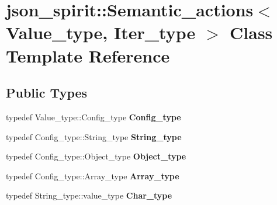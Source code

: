\hypertarget{classjson__spirit_1_1_semantic__actions}{}\section{json\+\_\+spirit\+::Semantic\+\_\+actions$<$ Value\+\_\+type, Iter\+\_\+type $>$ Class Template Reference}
\label{classjson__spirit_1_1_semantic__actions}
\subsection*{Public Types}
\begin{DoxyCompactItemize}
\item 
\mbox{\label{classjson__spirit_1_1_semantic__actions_ac131d112e94a0861e12253a0dc5a7036}} 
typedef Value\+\_\+type\+::\+Config\+\_\+type {\bfseries Config\+\_\+type}
\item 
\mbox{\label{classjson__spirit_1_1_semantic__actions_a3e726d04ba8bf36d2b1a16d7243f771c}} 
typedef Config\+\_\+type\+::\+String\+\_\+type {\bfseries String\+\_\+type}
\item 
\mbox{\label{classjson__spirit_1_1_semantic__actions_a2a1b932809452028f780b706442bc69c}} 
typedef Config\+\_\+type\+::\+Object\+\_\+type {\bfseries Object\+\_\+type}
\item 
\mbox{\label{classjson__spirit_1_1_semantic__actions_ae45b36c7c39d00d084532a9de4aaf53e}} 
typedef Config\+\_\+type\+::\+Array\+\_\+type {\bfseries Array\+\_\+type}
\item 
\mbox{\label{classjson__spirit_1_1_semantic__actions_a14acf53ba844eb982d4e109687e501d2}} 
typedef String\+\_\+type\+::value\+\_\+type {\bfseries Char\+\_\+type}
\end{DoxyCompactItemize}
